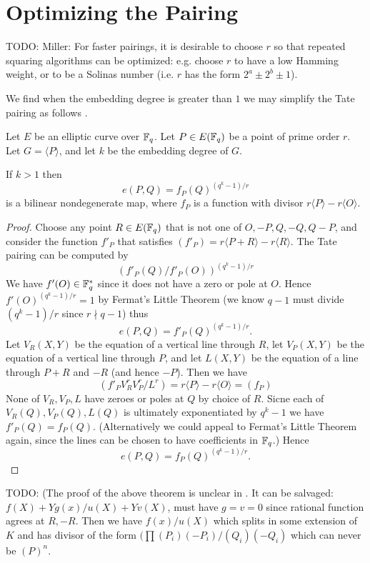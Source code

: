 \chapter{Optimizing the Pairing}

TODO: Miller:
For faster pairings, it is desirable to choose $r$ so that repeated squaring
algorithms can be optimized: e.g. choose $r$ to have a low Hamming weight,
or to be a Solinas number (i.e. $r$ has the form $2^a \pm 2^b \pm 1$).

We find when the embedding degree is greater than $1$ we may simplify
the Tate pairing as follows \cite{barreto, barreto2}.
\begin{theorem}
Let $E$ be an elliptic curve over $\mathbb{F}_q$.
Let $P \in E(\mathbb{F}_q)$ be a point of prime order $r$.
Let $G = \langle P \rangle$, and let $k$ be the embedding degree of $G$.

If $k > 1$ then
\[
e(P,Q) = f_P(Q)^{(q^k-1)/r}
\]
is a bilinear nondegenerate map,
where $f_P$ is a function with divisor $r\langle P\rangle - r\langle O\rangle$.
\end{theorem}

\begin{proof}
Choose any point $R \in E(\mathbb{F}_q)$ that is not one of
$O, -P, Q, -Q, Q - P$,
and consider the function $f'_P$ that satisfies $(f'_P) = r\langle P+R\rangle
- r\langle R \rangle$.
The Tate pairing can be computed by
\[
(f'_P(Q)/f'_P(O))^{(q^k-1)/r}
\]
We have $f'(O) \in \mathbb{F}_q^*$ since it does not have a zero or pole
at $O$. Hence
$f'(O)^{(q^k-1)/r} = 1$ by Fermat's Little Theorem (we know $q-1$ must
divide $(q^k - 1)/r$ since $r\nmid q-1$) thus
\[ e(P,Q) = f'_P(Q)^{(q^k-1)/r} . \]
Let $V_R(X,Y)$ be the equation of a vertical line through $R$,
let $V_P(X,Y)$ be the equation of a vertical line through $P$,
and let $L(X,Y)$ be the equation of a line through $P+R$ and $-R$ (and hence
$-P$).
Then we have
\[ (f'_P V_R^r V_P^r / L^r) = r \langle P \rangle - r \langle O \rangle
= (f_P) \]
None of $V_R, V_P, L$ have zeroes or poles at $Q$ by choice of $R$.
Sicne each of $V_R(Q), V_P(Q), L(Q)$ is ultimately exponentiated by $q^k-1$
we have $f'_P(Q) = f_P(Q)$.
(Alternatively we could appeal to Fermat's Little Theorem
again, since the lines can be chosen to have coefficients in $\mathbb{F}_q$.)
Hence
\[e(P,Q) = f_P(Q)^{(q^k-1)/r} . \]
\end{proof}

TODO:
(The proof of the above theorem is unclear in \cite{barreto}.
It can be salvaged: $f(X) + Y g(x) / u(X) + Y v(X)$, must have $g = v = 0$
since rational function agrees at $R, -R$. Then we have $f(x) / u(X)$
which splits in some extension of $K$ and
has divisor of the form $(\prod (P_i)(-P_i) / (Q_i)(-Q_i)$ which can
never be $(P)^n$.


